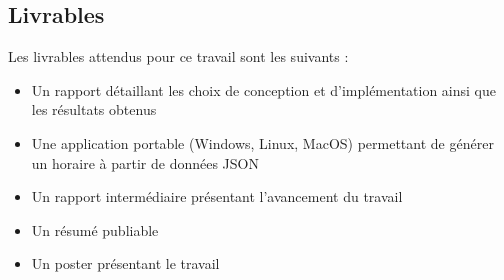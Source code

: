 \subsection{Livrables}
Les livrables attendus pour ce travail sont les suivants :

\begin{itemize}
    \item Un rapport détaillant les choix de conception et d'implémentation ainsi que les résultats obtenus
    \item Une application portable (Windows, Linux, MacOS) permettant de générer un horaire à partir de données JSON
    \item Un rapport intermédiaire présentant l'avancement du travail
    \item Un résumé publiable
    \item Un poster présentant le travail
\end{itemize}